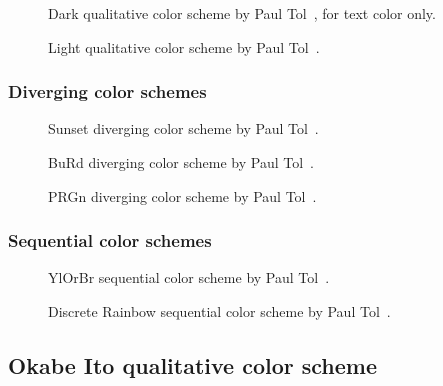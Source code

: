 \documentclass{scrartcl}
\begin{document}
\begin{figure}[ht]
    \centering
    \caption{Dark qualitative color scheme by Paul Tol~\cite{Tol}, for text color only.}
    \label{fig:T_Q_DT}
\end{figure}

\begin{figure}[ht]
    \centering
    \caption{Light qualitative color scheme by Paul Tol~\cite{Tol}.}
    \label{fig:T_Q_L}
\end{figure}

\subsubsection{Diverging color schemes}

\begin{figure}[ht]
    \centering
    \caption{Sunset diverging color scheme by Paul Tol~\cite{Tol}.}
    \label{fig:T_D_S}
\end{figure}

\begin{figure}[ht]
    \centering
    \caption{BuRd diverging color scheme by Paul Tol~\cite{Tol}.}
    \label{fig:T_D_BR}
\end{figure}

\begin{figure}[ht]
    \centering
    \caption{PRGn diverging color scheme by Paul Tol~\cite{Tol}.}
    \label{fig:T_D_PG}
\end{figure}

\subsubsection{Sequential color schemes}

\begin{figure}[ht]
    \centering
    \caption{YlOrBr sequential color scheme by Paul Tol~\cite{Tol}.}
    \label{fig:T_S_YB}
\end{figure}

\begin{figure}[ht]
    \centering
    \caption{Discrete Rainbow sequential color scheme by Paul Tol~\cite{Tol}.}
    \label{fig:T_S_DR}
\end{figure}

\subsection{Okabe Ito qualitative color scheme}
\end{document}
